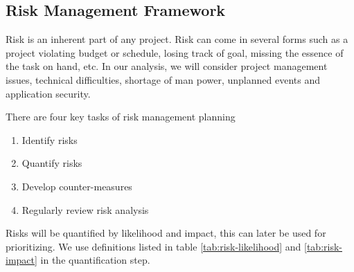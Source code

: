 \subsection{Risk Management Framework}

Risk is an inherent part of any project. Risk can come in several forms such as a
project violating budget or schedule, losing track of goal, missing the
essence of the task on hand, etc. In our analysis, we will consider project
management issues, technical difficulties, shortage of man power, unplanned events
and application security\cite{risk:rmf1}.

There are four key tasks of risk management planning\cite{risk:rmf2}
\begin{enumerate}
    \item{Identify risks}
	\item{Quantify risks}
	\item{Develop counter-measures}
    \item{Regularly review risk analysis}
\end{enumerate}

Risks will be quantified by likelihood and impact, this can later be used for
prioritizing. We use definitions listed in table \ref{tab:risk-likelihood} and
\ref{tab:risk-impact} in the quantification step.

